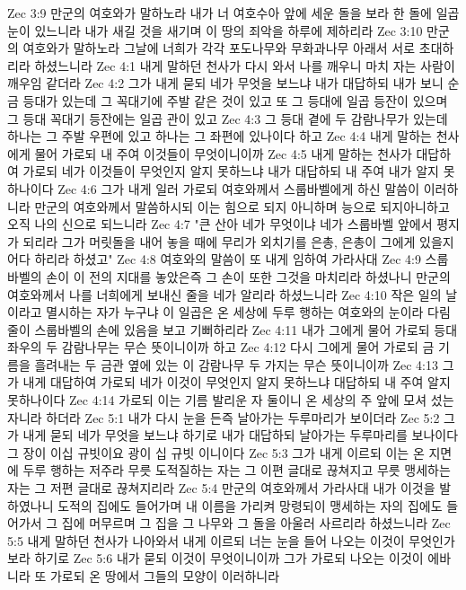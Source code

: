 Zec 3:9  만군의 여호와가 말하노라 내가 너 여호수아 앞에 세운 돌을 보라 한 돌에 일곱 눈이 있느니라 내가 새길 것을 새기며 이 땅의 죄악을 하루에 제하리라
Zec 3:10  만군의 여호와가 말하노라 그날에 너희가 각각 포도나무와 무화과나무 아래서 서로 초대하리라 하셨느니라
Zec 4:1  내게 말하던 천사가 다시 와서 나를 깨우니 마치 자는 사람이 깨우임 같더라
Zec 4:2  그가 내게 묻되 네가 무엇을 보느냐 내가 대답하되 내가 보니 순금 등대가 있는데 그 꼭대기에 주발 같은 것이 있고 또 그 등대에 일곱 등잔이 있으며 그 등대 꼭대기 등잔에는 일곱 관이 있고
Zec 4:3  그 등대 곁에 두 감람나무가 있는데 하나는 그 주발 우편에 있고 하나는 그 좌편에 있나이다 하고
Zec 4:4  내게 말하는 천사에게 물어 가로되 내 주여 이것들이 무엇이니이까
Zec 4:5  내게 말하는 천사가 대답하여 가로되 네가 이것들이 무엇인지 알지 못하느냐 내가 대답하되 내 주여 내가 알지 못하나이다
Zec 4:6  그가 내게 일러 가로되 여호와께서 스룹바벨에게 하신 말씀이 이러하니라 만군의 여호와께서 말씀하시되 이는 힘으로 되지 아니하며 능으로 되지아니하고 오직 나의 신으로 되느니라
Zec 4:7  "큰 산아 네가 무엇이냐 네가 스룹바벨 앞에서 평지가 되리라 그가 머릿돌을 내어 놓을 때에 무리가 외치기를 은총, 은총이 그에게 있을지어다 하리라 하셨고"
Zec 4:8  여호와의 말씀이 또 내게 임하여 가라사대
Zec 4:9  스룹바벨의 손이 이 전의 지대를 놓았은즉 그 손이 또한 그것을 마치리라 하셨나니 만군의 여호와께서 나를 너희에게 보내신 줄을 네가 알리라 하셨느니라
Zec 4:10  작은 일의 날이라고 멸시하는 자가 누구냐 이 일곱은 온 세상에 두루 행하는 여호와의 눈이라 다림줄이 스룹바벨의 손에 있음을 보고 기뻐하리라
Zec 4:11  내가 그에게 물어 가로되 등대 좌우의 두 감람나무는 무슨 뜻이니이까 하고
Zec 4:12  다시 그에게 물어 가로되 금 기름을 흘려내는 두 금관 옆에 있는 이 감람나무 두 가지는 무슨 뜻이니이까
Zec 4:13  그가 내게 대답하여 가로되 네가 이것이 무엇인지 알지 못하느냐 대답하되 내 주여 알지 못하나이다
Zec 4:14  가로되 이는 기름 발리운 자 둘이니 온 세상의 주 앞에 모셔 섰는 자니라 하더라
Zec 5:1  내가 다시 눈을 든즉 날아가는 두루마리가 보이더라
Zec 5:2  그가 내게 묻되 네가 무엇을 보느냐 하기로 내가 대답하되 날아가는 두루마리를 보나이다 그 장이 이십 규빗이요 광이 십 규빗 이니이다
Zec 5:3  그가 내게 이르되 이는 온 지면에 두루 행하는 저주라 무릇 도적질하는 자는 그 이편 글대로 끊쳐지고 무릇 맹세하는 자는 그 저편 글대로 끊쳐지리라
Zec 5:4  만군의 여호와께서 가라사대 내가 이것을 발하였나니 도적의 집에도 들어가며 내 이름을 가리켜 망령되이 맹세하는 자의 집에도 들어가서 그 집에 머무르며 그 집을 그 나무와 그 돌을 아울러 사르리라 하셨느니라
Zec 5:5  내게 말하던 천사가 나아와서 내게 이르되 너는 눈을 들어 나오는 이것이 무엇인가 보라 하기로
Zec 5:6  내가 묻되 이것이 무엇이니이까 그가 가로되 나오는 이것이 에바니라 또 가로되 온 땅에서 그들의 모양이 이러하니라
